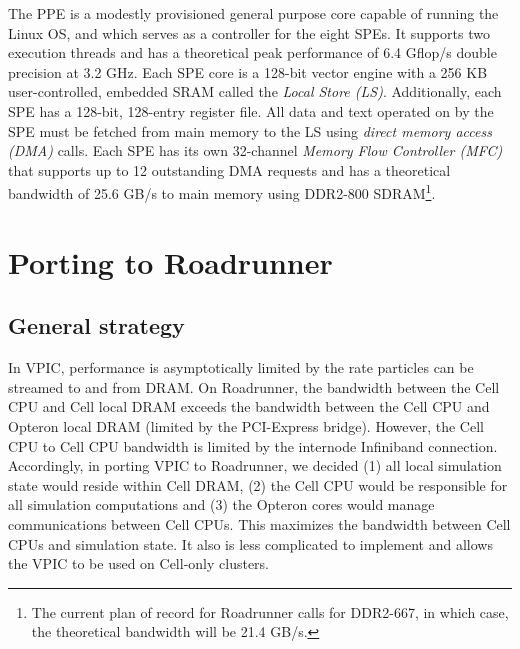 \documentclass[10pt]{article}
\begin{document}
The PPE is a modestly provisioned general purpose core capable of
running the Linux OS, and which serves as a controller for the eight
SPEs.  It supports two execution threads and has a theoretical peak
performance of 6.4 Gflop/s double precision at 3.2 GHz.  Each SPE core
is a 128-bit vector engine with a 256 KB user-controlled, embedded
SRAM called the \emph{Local Store (LS)}.  Additionally, each SPE has a
128-bit, 128-entry register file.  All data and text operated on by
the SPE must be fetched from main memory to the LS using \emph{direct
memory access (DMA)} calls.  Each SPE has its own 32-channel
\emph{Memory Flow Controller (MFC)} that supports up to 12 outstanding
DMA requests and has a theoretical bandwidth of 25.6 GB/s to main
memory using DDR2-800 SDRAM\footnote{The current plan of record for
Roadrunner calls for DDR2-667, in which case, the theoretical
bandwidth will be 21.4 GB/s.}.



\section{Porting to Roadrunner}

\subsection{General strategy}

In VPIC, performance is asymptotically limited by the rate particles
can be streamed to and from DRAM.  On Roadrunner, the bandwidth
between the Cell CPU and Cell local DRAM exceeds the bandwidth between
the Cell CPU and Opteron local DRAM (limited by the PCI-Express
bridge).  However, the Cell CPU to Cell CPU bandwidth is limited by
the internode Infiniband connection.  Accordingly, in porting VPIC to
Roadrunner, we decided (1) all local simulation state would reside
within Cell DRAM, (2) the Cell CPU would be responsible for all
simulation computations and (3) the Opteron cores would manage
communications between Cell CPUs.  This maximizes the bandwidth
between Cell CPUs and simulation state.  It also is less complicated
to implement and allows the VPIC to be used on Cell-only clusters.
\end{document}

